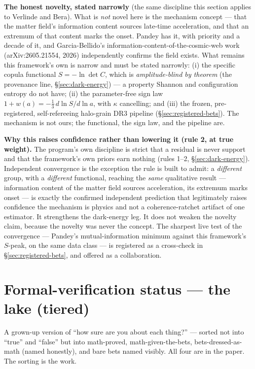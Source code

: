 \documentclass[11pt,a4paper]{article}
\begin{document}
\textbf{The honest novelty, stated narrowly} (the same discipline this section applies to Verlinde and Bera). What is \emph{not} novel here is the mechanism concept --- that the matter field's information content sources late-time acceleration, and that an extremum of that content marks the onset. Pandey has it, with priority and a decade of it, and Garcia-Bellido's information-content-of-the-cosmic-web work (arXiv:2605.21554, 2026) independently confirms the field exists. What remains this framework's own is narrow and must be stated narrowly: (i) the specific copula functional $S = -\ln\det C$, which is \emph{amplitude-blind by theorem} (the provenance line, \S\ref{sec:dark-energy}) --- a property Shannon and configuration entropy do not have; (ii) the parameter-free sign law $1 + w(a) = -\tfrac13\,d\ln S/d\ln a$, with $\kappa$ cancelling; and (iii) the frozen, pre-registered, self-refereeing halo-grain DR3 pipeline (\S\ref{sec:registered-bets}). The mechanism is not ours; the functional, the sign law, and the pipeline are.

\textbf{Why this raises confidence rather than lowering it (rule 2, at true weight).} The program's own discipline is strict that a residual is never support and that the framework's own priors earn nothing (rules 1--2, \S\ref{sec:dark-energy}). Independent convergence is the exception the rule is built to admit: a \emph{different} group, with a \emph{different} functional, reaching the \emph{same} qualitative result --- information content of the matter field sources acceleration, its extremum marks onset --- is exactly the confirmed independent prediction that legitimately raises confidence the mechanism is physics and not a coherence-ratchet artifact of one estimator. It strengthens the dark-energy leg. It does not weaken the novelty claim, because the novelty was never the concept. The sharpest live test of the convergence --- Pandey's mutual-information minimum against this framework's $S$-peak, on the same data class --- is registered as a cross-check in \S\ref{sec:registered-bets}, and offered as a collaboration.

\section{Formal-verification status --- the lake (tiered)}\label{sec:lake}

A grown-up version of ``how sure are you about each thing?'' --- sorted not into ``true'' and ``false'' but into math-proved, math-given-the-bets, bets-dressed-as-math (named honestly), and bare bets named visibly. All four are in the paper. The sorting is the work.
\end{document}
